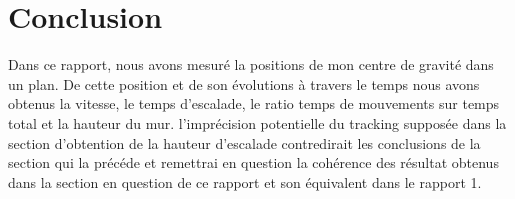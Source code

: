 \documentclass[11pt]{article}
\begin{document}
\section{Conclusion}
\label{sec:orga0bac7b}

Dans ce rapport, nous avons mesuré la positions de mon centre de gravité dans un plan. De cette position et de son évolutions à travers le temps nous
avons obtenus la vitesse, le temps d'escalade, le ratio temps de mouvements sur temps total et la hauteur du mur. l'imprécision potentielle du tracking
supposée dans la section d'obtention de la hauteur d'escalade contredirait les conclusions de la section qui la précéde et remettrai en question la
cohérence des résultat obtenus dans la section en question de ce rapport et son équivalent dans le rapport 1.
\end{document}
